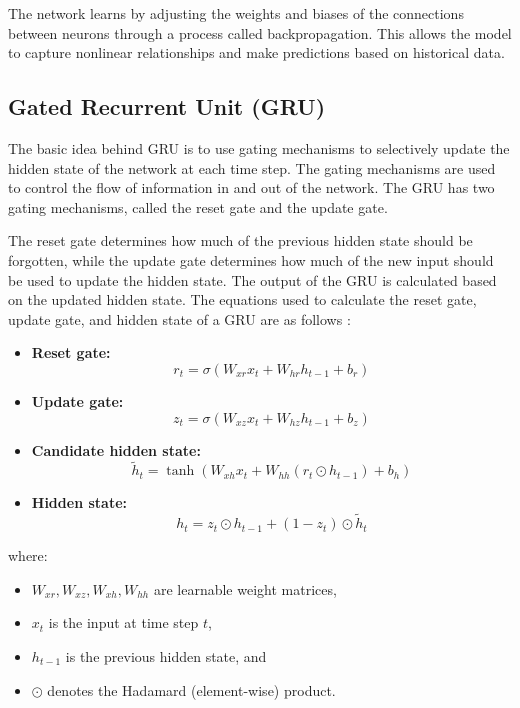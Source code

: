 \documentclass{ieeeojies}
\begin{document}
The network learns by adjusting the weights and biases of the connections between neurons through a process called backpropagation. This allows the model to capture nonlinear relationships and make predictions based on historical data.
\subsection{Gated Recurrent Unit (GRU)}

The basic idea behind GRU is to use gating mechanisms to selectively update the hidden state of the network at each time step. The gating mechanisms are used to control the flow of information in and out of the network. The GRU has two gating mechanisms, called the reset gate and the update gate.

The reset gate determines how much of the previous hidden state should be forgotten, while the update gate determines how much of the new input should be used to update the hidden state. The output of the GRU is calculated based on the updated hidden state.
\doublespacing
The equations used to calculate the reset gate, update gate, and hidden state of a GRU are as follows \cite{b7}:

\begin{itemize}
    \item \textbf{Reset gate:} \\
    \[
    r_t = \sigma(W_{xr} x_t + W_{hr} h_{t-1} + b_r)
    \]
    \item \textbf{Update gate:} \\
    \[
    z_t = \sigma(W_{xz} x_t + W_{hz} h_{t-1} + b_z)
    \]
    \item \textbf{Candidate hidden state:} \\
    \[
    \tilde{h}_t = \tanh(W_{xh} x_t + W_{hh} (r_t \odot h_{t-1}) + b_h)
    \]
    \item \textbf{Hidden state:} \\
    \[
    h_t = z_t \odot h_{t-1} + (1 - z_t) \odot \tilde{h}_t
    \]
\end{itemize}

where:

\begin{itemize}
    \item \(W_{xr}, W_{xz}, W_{xh}, W_{hh}\) are learnable weight matrices,
    \item \(x_t\) is the input at time step \(t\),
    \item \(h_{t-1}\) is the previous hidden state, and
    \item \(\odot\) denotes the Hadamard (element-wise) product.
\end{itemize}
\end{document}

